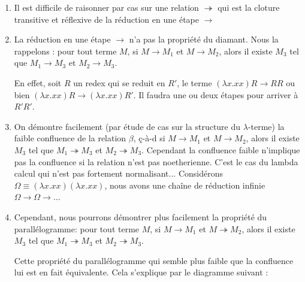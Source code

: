 \begin{enumerate}
	\item Il est difficile de raisonner par cas sur une relation $\twoheadrightarrow $
	 qui est la cloture transitive
	 et réflexive de la réduction en une étape $\rightarrow$

	\item La réduction en une étape $\rightarrow$ n'a pas la propriété du diamant. Nous la rappelons : pour tout terme $M$,
	 si $M\rightarrow  M_1$ et  $M\rightarrow M_2$,
alors il existe $M_3$ tel que $M_1\rightarrow M_3$ et  $M_2\rightarrow M_3$.

En effet, soit $R$ un redex qui se reduit en $R'$, le terme $(\lambda x.xx) R \rightarrow RR$ ou bien 
 $(\lambda x.xx) R \rightarrow (\lambda x.xx) R'$. Il faudra une ou deux étapes pour arriver à $R'R'$. 

 \item On démontre facilement (par étude de cas sur la structure du $\lambda$-terme) 
 la faible confluence de la relation $\beta$, ç-à-d si $M \rightarrow M_1$ et $M \rightarrow M_2$, alors
 il existe $M_3$ tel que $M_1 \twoheadrightarrow M_3$ et $M_2 \twoheadrightarrow M_3$.
 Cependant la confluence faible n'implique pas la confluence si la relation n'est pas noetherienne.
 C'est le cas du lambda calcul qui n'est pas fortement normalisant... 
Considérons $\Omega \equiv (\lambda x.xx) (\lambda x.xx) $, nous avons une chaîne de réduction infinie $\Omega \rightarrow \Omega \rightarrow \dots $

 \item Cependant, nous pourrons démontrer plus facilement la propriété du parallélogramme: pour tout terme $M$,
  si $M\rightarrow M_1$ et  $M\twoheadrightarrow  M_2$,
alors il existe $M_3$ tel que $M_1\twoheadrightarrow  M_3$ et  $M_2\twoheadrightarrow M_3$.

Cette propriété du parallélogramme qui semble plus faible que la confluence lui est en fait équivalente. Cela
s'explique par le diagramme suivant :

\begin{center}
\end{center}
\end{enumerate}
